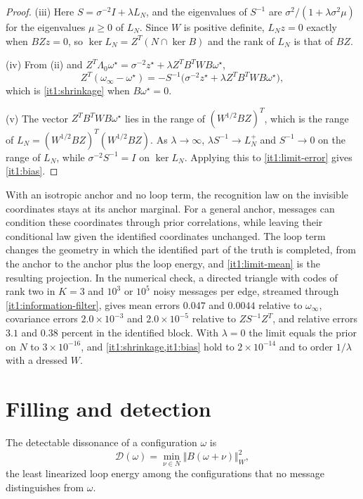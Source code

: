 \documentclass[11pt,letterpaper]{report}
\begin{document}
\begin{proof}
(iii) Here $S=\sigma^{-2}I+\lambda L_N$, and the eigenvalues of $S^{-1}$ are $\sigma^2/(1+\lambda\sigma^2\mu)$ for the eigenvalues $\mu\geq0$ of $L_N$. Since $W$ is positive definite, $L_Nz=0$ exactly when $BZz=0$, so $\ker L_N=Z^T(N\cap\ker B)$ and the rank of $L_N$ is that of $BZ$.

(iv) From (ii) and $Z^T\Lambda_0\omega^\star=\sigma^{-2}z^\star+\lambda Z^TB^TWB\omega^\star$,
\begin{equation}
Z^T(\omega_\infty-\omega^\star)=-S^{-1}\bigl(\sigma^{-2}z^\star+\lambda Z^TB^TWB\omega^\star\bigr),
\label{it1:limit-error}
\end{equation}
which is \cref{it1:shrinkage} when $B\omega^\star=0$.

(v) The vector $Z^TB^TWB\omega^\star$ lies in the range of $(W^{1/2}BZ)^T$, which is the range of $L_N=(W^{1/2}BZ)^T(W^{1/2}BZ)$. As $\lambda\to\infty$, $\lambda S^{-1}\to L_N^+$ and $S^{-1}\to0$ on the range of $L_N$, while $\sigma^{-2}S^{-1}=I$ on $\ker L_N$. Applying this to \cref{it1:limit-error} gives \cref{it1:bias}.
\end{proof}

With an isotropic anchor and no loop term, the recognition law on the invisible coordinates stays at its anchor marginal. For a general anchor, messages can condition these coordinates through prior correlations, while leaving their conditional law given the identified coordinates unchanged. The loop term changes the geometry in which the identified part of the truth is completed, from the anchor to the anchor plus the loop energy, and \cref{it1:limit-mean} is the resulting projection. In the numerical check, a directed triangle with codes of rank two in $K=3$ and $10^3$ or $10^5$ noisy messages per edge, streamed through \cref{it1:information-filter}, gives mean errors $0.047$ and $0.0044$ relative to $\omega_\infty$, covariance errors $2.0\times10^{-3}$ and $2.0\times10^{-5}$ relative to $ZS^{-1}Z^T$, and relative errors $3.1$ and $0.38$ percent in the identified block. With $\lambda=0$ the limit equals the prior on $N$ to $3\times10^{-16}$, and \cref{it1:shrinkage,it1:bias} hold to $2\times10^{-14}$ and to order $1/\lambda$ with a dressed $W$.

\section{Filling and detection}

The detectable dissonance of a configuration $\omega$ is
\begin{equation}
\mathcal D(\omega)=\min_{\nu\in N}\Vert B(\omega+\nu)\Vert_W^2,
\label{it1:detectable-eq}
\end{equation}
the least linearized loop energy among the configurations that no message distinguishes from $\omega$.
\end{document}
